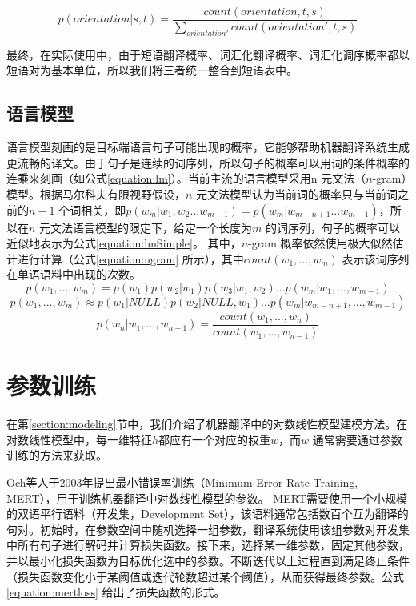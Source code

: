 \documentclass[master, winfont]{njuthesis}
\begin{document}
\begin{equation}
  \label{equation:lrm}
    p(orientation|s,t)=\frac{count(orientation,t,s)}{\sum_{orientation'} count(orientation',t,s)}
\end{equation}

最终，在实际使用中，由于短语翻译概率、词汇化翻译概率、词汇化调序概率都以短语对为基本单位，所以我们将三者统一整合到短语表中。

\subsection{语言模型}
语言模型刻画的是目标端语言句子可能出现的概率，它能够帮助机器翻译系统生成更流畅的译文。由于句子是连续的词序列，所以句子的概率可以用词的条件概率的连乘来刻画（如公式\ref{equation:lm}）。当前主流的语言模型采用n 元文法（$n$-gram）模型\cite{manning1999foundations}。根据马尔科夫有限视野假设，$n$ 元文法模型认为当前词的概率只与当前词之前的$n-1$ 个词相关，即$p(w_m|w_1,w_2...w_{m-1})=p(w_m|w_{m-n+1}...w_{m-1})$，所以在$n$ 元文法语言模型的限定下，给定一个长度为$m$ 的词序列，句子的概率可以近似地表示为公式\ref{equation:lmSimple}。 其中，$n$-gram 概率依然使用极大似然估计进行计算（公式\ref{equation:ngram} 所示），其中$count(w_1,...,w_m)$ 表示该词序列在单语语料中出现的次数。
\begin{equation}
  \label{equation:lm}
      p(w_1,...,w_m) = p(w_1)p(w_2|w_1)p(w_3|w_1,w_2)...p(w_m|w_1,...,w_{m-1})
\end{equation}
\begin{equation}
  \label{equation:lmSimple}
  p(w_1,...,w_m) \approx p(w_1|NULL)p(w_2|NULL,w_1)...p(w_m|w_{m-n+1},...,w_{m-1})
\end{equation}
\begin{equation}
  \label{equation:ngram}
  p(w_n|w_1,...,w_{n-1})=\frac{count(w_1,...,w_n)}{count(w_1,...,w_{n-1})}
\end{equation}

\section{参数训练}\label{section:parameter}
在第\ref{section:modeling}节中，我们介绍了机器翻译中的对数线性模型建模方法。在对数线性模型中，每一维特征$h$都应有一个对应的权重$w$，而$w$ 通常需要通过参数训练的方法来获取。

Och等人\cite{och2003minimum}于2003年提出最小错误率训练（Minimum Error Rate Training, MERT），用于训练机器翻译中对数线性模型的参数。
MERT需要使用一个小规模的双语平行语料（开发集，Development Set），该语料通常包括数百个互为翻译的句对。初始时，在参数空间中随机选择一组参数，翻译系统使用该组参数对开发集中所有句子进行解码并计算损失函数。接下来，选择某一维参数，固定其他参数，并以最小化损失函数为目标优化选中的参数。不断迭代以上过程直到满足终止条件（损失函数变化小于某阈值或迭代轮数超过某个阈值），从而获得最终参数。公式\ref{equation:mertloss} 给出了损失函数的形式。
\end{document}
